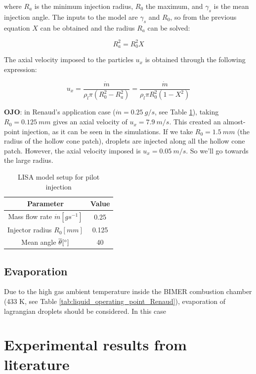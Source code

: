 where $R_a$ is the minimum injection radius, $R_0$ the maximum, and $\gamma_s$ is the mean injection angle. The inputs to the model are $\gamma_s$ and $R_0$, so from the previous equation $X$ can be obtained and the radius $R_a$ can be solved:

\begin{equation}
R_a^2 = R_0^2 X
\end{equation}

The axial velocity imposed to the particles $u_x$ is obtained through the following expression:

\begin{equation}
u_x = \frac{\dot{m}}{\rho_l \pi \left( R_0^2 - R_a^2 \right)} = \frac{\dot{m}}{\rho_l \pi R_0^2 \left( 1 - X^2 \right)} 
\end{equation}

\textbf{OJO}: in Renaud's application case ($\dot{m} = 0.25 ~ g/s$, see Table \ref{tab:LISA_model_parameters}), taking $R_0 = 0.125 ~mm$ gives an axial velocity of $u_x = 7.9 ~ m/s$. This created an almost-point injection, as it can be seen in the simulations. If we take $R_0 = 1.5 ~mm$ (the radius of the hollow cone patch), droplets are injected along all the hollow cone patch. However, the axial velocity imposed is $u_x = 0.05 ~m/s$. So we'll go towards the large radius.

\begin{table}[!h]
\centering
\caption{LISA model setup for pilot injection}
\begin{tabular}{|c|c|}
\hline
\textbf{Parameter} & \textbf{Value} \\
\hline
Mass flow rate $\dot{m} [g s^{-1}]$ & 0.25 \\
\hline
Injector radius $R_0 [mm]$ & 0.125 \\
\hline
Mean angle $\overline{\theta} [\degree]$ & 40 \\
\hline
\end{tabular}
\label{tab:LISA_model_parameters}
\end{table}

\subsection{Evaporation}

Due to the high gas ambient temperature inside the BIMER combustion chamber (433 K, see Table \ref{tab:liquid_operating_point_Renaud}), evaporation of lagrangian droplets should be considered. In this case 

\section{Experimental results from literature}
\label{ch9:sec_expe_results_LGS_BIMER}

